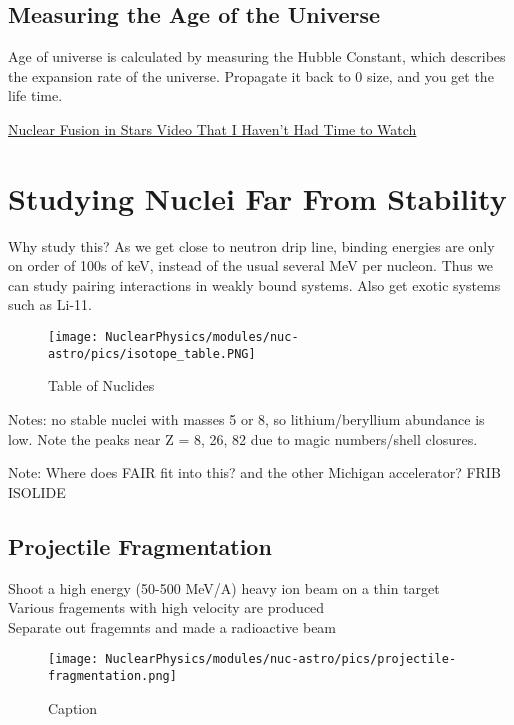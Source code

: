         \subsection{Measuring the Age of the Universe}
        Age of universe is calculated by measuring the Hubble Constant, which describes the expansion rate of the universe. Propagate it back to 0 size, and you get the life time. 
            
            \href{https://www.youtube.com/watch?v=TtIeozyQ3Is}{Nuclear Fusion in Stars Video That I Haven't Had Time to Watch}
            

    \section{Studying Nuclei Far From Stability}
        Why study this? As we get close to neutron drip line, binding energies are only on order of 100s of keV, instead of the usual several MeV per nucleon. Thus we can study pairing interactions in weakly bound systems. Also get exotic systems such as Li-11. 
             
            \begin{figure}[H]
                \centering
                \texttt{[image: NuclearPhysics/modules/nuc-astro/pics/isotope\_table.PNG]}
            \caption{Table of Nuclides}
            \end{figure}
            
            Notes: no stable nuclei with masses 5 or 8, so lithium/beryllium abundance is low. Note the peaks near Z = 8, 26, 82 due to magic numbers/shell closures.
   
        Note: Where does FAIR fit into this? and the other Michigan accelerator?
        FRIB ISOLIDE
        \subsection{Projectile Fragmentation}
            Shoot a high energy (50-500 MeV/A) heavy ion beam on a thin target\\
            Various fragements with high velocity are produced\\
            Separate out fragemnts and made a radioactive beam\\
            
            
            \begin{figure}[H]
                \centering
                \texttt{[image: NuclearPhysics/modules/nuc-astro/pics/projectile-fragmentation.png]}
            \caption{Caption}
            \end{figure}
            
